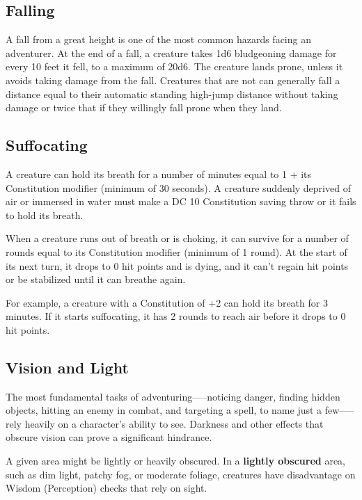 \subsection{Falling}

A fall from a great height is one of the most common hazards facing an adventurer. At the end of a fall, a creature takes 1d6 bludgeoning damage for every 10 feet it fell, to a maximum of 20d6. The creature lands prone, unless it avoids taking damage from the fall. Creatures that are not  can generally fall a distance equal to their automatic standing high-jump distance without taking damage or twice that if they willingly fall prone when they land.

\subsection{Suffocating}

A creature can hold its breath for a number of minutes equal to 1 + its Constitution modifier (minimum of 30 seconds). A creature suddenly deprived of air or immersed in water must make a DC 10 Constitution saving throw or it fails to hold its breath.

When a creature runs out of breath or is choking, it can survive for a number of rounds equal to its Constitution modifier (minimum of 1 round). At the start of its next turn, it drops to 0 hit points and is dying, and it can't regain hit points or be stabilized until it can breathe again.

For example, a creature with a Constitution of +2 can hold its breath for 3 minutes. If it starts suffocating, it has 2 rounds to reach air before it drops to 0 hit points.

\subsection{Vision and Light}\label{sub:vision}

The most fundamental tasks of adventuring—--noticing danger, finding hidden objects, hitting an enemy in combat, and targeting a spell, to name just a few—--rely heavily on a character's ability to see. Darkness and other effects that obscure vision can prove a significant hindrance.

A given area might be lightly or heavily obscured. In a \textbf{lightly obscured} area, such as dim light, patchy fog, or moderate foliage, creatures have disadvantage on Wisdom (Perception) checks that rely on sight.

